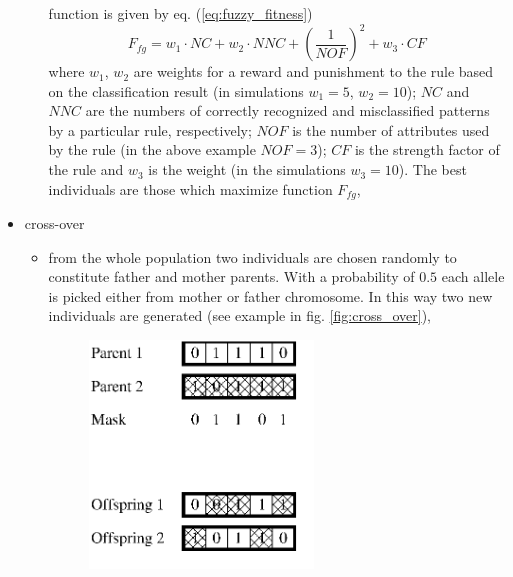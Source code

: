 \begin{itemize}
\begin{itemize}
                function is given by eq. (\ref{eq:fuzzy_fitness})
                \begin{equation}
                    F_{fg} = w_1\cdot NC + w_2\cdot NNC + (\frac{1}{NOF})^2 +
                    w_3\cdot CF
                    \label{eq:fuzzy_fitness}
                \end{equation}
                where $w_1$, $w_2$ are weights for a reward and punishment to
                the rule based on the classification result (in simulations
                $w_1=5$, $w_2=10$); $NC$ and $NNC$ are
                the numbers of correctly recognized and misclassified patterns
                by a particular rule, respectively; $NOF$ is the number of
                attributes used by the rule (in the above example $NOF=3$);
                $CF$ is the strength factor of the rule and $w_3$ is the
                weight (in the simulations $w_3=10$).
                The best individuals are those which maximize function
                $F_{fg}$,
        \end{itemize}
    \item cross-over
        \begin{itemize}
            \item from the whole population two individuals are chosen
                randomly to constitute father and mother parents. With a
                probability of $0.5$ each allele is picked either from mother
                or father chromosome. In this way two new
                individuals are generated (see example in fig.
                \ref{fig:cross_over}),
                \begin{figure}[H]
                    \begin{center}
                        \includegraphics[width=0.6\textwidth, height=0.5\textwidth]{fig/cross_over.png}
                    \end{center}

\end{figure}
\end{itemize}
\end{itemize}
